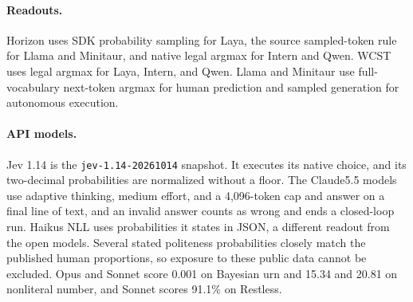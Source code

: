 \documentclass[11pt,a4paper]{article}
\begin{document}
\paragraph{Readouts.}
Horizon uses SDK probability sampling for Laya, the source sampled-token rule for Llama and Minitaur, and native legal argmax for Intern and Qwen. WCST uses legal argmax for Laya, Intern, and Qwen. Llama and Minitaur use full-vocabulary next-token argmax for human prediction and sampled generation for autonomous execution.

\paragraph{API models.}
Jev 1.14 is the \texttt{jev-1.14-20261014} snapshot. It executes its native choice, and its two-decimal probabilities are normalized without a floor. The Claude5.5 models use adaptive thinking, medium effort, and a 4,096-token cap and answer on a final line of text, and an invalid answer counts as wrong and ends a closed-loop run. Haiku\textquotesingle{}s NLL uses probabilities it states in JSON, a different readout from the open models. Several stated politeness probabilities closely match the published human proportions, so exposure to these public data cannot be excluded. Opus and Sonnet score 0.001 on Bayesian urn and 15.34 and 20.81 on nonliteral number, and Sonnet scores 91.1\% on Restless.
\end{document}

